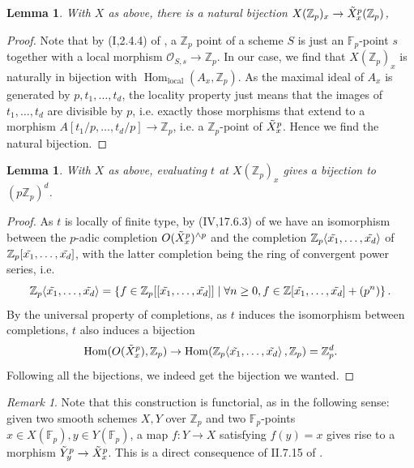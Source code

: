 \documentclass[12pt]{article}
\newcommand{\Z}{\mathbb{Z}}
\renewcommand{\O}{\mathcal{O}}
\newcommand{\F}{\mathbb{F}}
\renewcommand{\angle}[1]{\hspace{-2pt}\left\langle #1 \right\rangle}
\DeclareMathOperator{\Hom}{Hom}
\theoremstyle{plain}
\newtheorem{lem}[thm]{Lemma} %
\theoremstyle{definition}
\theoremstyle{remark}
\newtheorem{rem}[thm]{Remark} %
\begin{document}
\begin{lem}
With $X$ as above, there is a natural bijection $X(\Z_p)_x \to \Tilde{X}_x^p(\Z_p)$,
\end{lem}
\begin{proof}
Note that by (I,2.4.4) of \cite{ega}, a $\Z_p$ point of a scheme $S$ is just an $\F_p$-point $s$ together with a local morphism $\O_{S,s} \to \Z_p$. In our case, we find that $X(\Z_p)_x$ is naturally in bijection with $\Hom_{\text{local}}(A_x,\Z_p)$. As the maximal ideal of $A_x$ is generated by $p,t_1,\dots,t_d$, the locality property just means that the images of $t_1,\dots,t_d$ are divisible by $p$, i.e. exactly those morphisms that extend to a morphism $A[t_1/p,\dots,t_d/p] \to \Z_p$, i.e. a $\Z_p$-point of $\Tilde{X}_x^p$. Hence we find the natural bijection.
\end{proof}

\begin{lem}
With $X$ as above, evaluating $t$ at $X(\Z_p)_x$ gives a bijection to $(p\Z_p)^d$.
\end{lem}
\begin{proof}
As $t$ is locally of finite type, by (IV,17.6.3) of \cite{ega} we have an isomorphism between the $p$-adic completion $O(\Tilde{X}_x^p)^{\wedge p}$ and the completion $\Z_p\angle{\Tilde{x_1},\dots, \Tilde{x_d}}$ of $\Z_p[\Tilde{x_1},\dots,\Tilde{x_d}]$, with the latter completion being the ring of convergent power series, i.e.
\[
\Z_p\angle{\Tilde{x_1},\dots, \Tilde{x_d}} = \left\{f \in \Z_p[[\Tilde{x_1},\dots,\Tilde{x_d}]] \mid \forall n \geq 0, f \in \Z[\Tilde{x_1},\dots,\tilde{x_d}] + (p^n) \right\}.
\]
By the universal property of completions, as $t$ induces the isomorphism between completions, $t$ also induces a bijection $$\Hom(O(\Tilde{X}_x^p), \Z_p) \to \Hom(\Z_p\angle{\Tilde{x_1},\dots,\Tilde{x_d}},\Z_p) = \Z_p^d.$$ Following all the bijections, we indeed get the bijection we wanted.
\end{proof}

\begin{rem}
\label{rem:smoothpointsfunc}
Note that this construction is functorial, as in the following sense: given two smooth schemes $X,Y$ over $\Z_p$ and two $\F_p$-points $x\in X(\F_p), y\in Y(\F_p)$, a map $f: Y \to X$ satisfying $f(y) = x$ gives rise to a morphism $\Tilde{Y}_y^p \to \Tilde{X}_x^p$. This is a direct consequence of II.7.15 of \citep{hartshorne}.
\end{rem}
\end{document}
